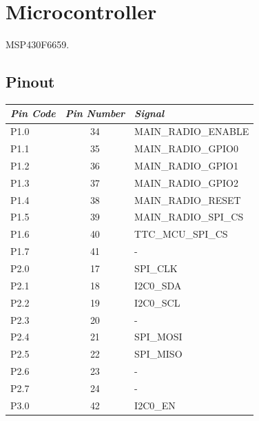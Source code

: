 \section{Microcontroller}

MSP430F6659.

\subsection{Pinout}

\begin{longtable}{lcl}
    \toprule[1.5pt]
    \textit{Pin Code} & \textit{Pin Number} & \textit{Signal}       \\
    \midrule
    P1.0              & 34                  & MAIN\_RADIO\_ENABLE   \\
    P1.1              & 35                  & MAIN\_RADIO\_GPIO0    \\
    P1.2              & 36                  & MAIN\_RADIO\_GPIO1    \\
    P1.3              & 37                  & MAIN\_RADIO\_GPIO2    \\
    P1.4              & 38                  & MAIN\_RADIO\_RESET    \\
    P1.5              & 39                  & MAIN\_RADIO\_SPI\_CS  \\
    P1.6              & 40                  & TTC\_MCU\_SPI\_CS     \\
    P1.7              & 41                  & -                     \\
    \midrule
    P2.0              & 17                  & SPI\_CLK              \\
    P2.1              & 18                  & I2C0\_SDA             \\
    P2.2              & 19                  & I2C0\_SCL             \\
    P2.3              & 20                  & -                     \\
    P2.4              & 21                  & SPI\_MOSI             \\
    P2.5              & 22                  & SPI\_MISO             \\
    P2.6              & 23                  & -                     \\
    P2.7              & 24                  & -                     \\
    \midrule
    P3.0              & 42                  & I2C0\_EN              \\

\end{longtable}
